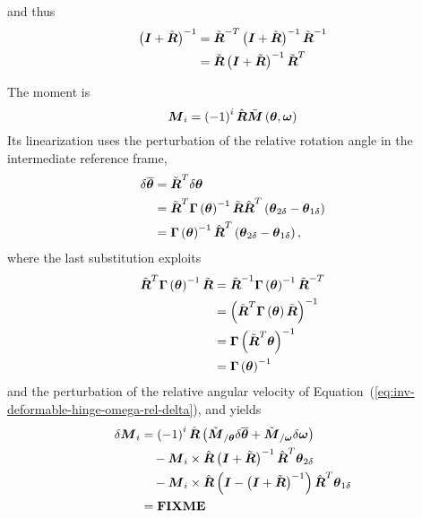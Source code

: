 \documentclass[10pt,dvips,fleqn]{report}
\newcommand{\T}[1]{\boldsymbol{#1}}
\begin{document}
and thus
\begin{align}
	\plbr{\T{I} + \tilde{\T{R}}}^{-1}
	&= \tilde{\T{R}}^{-T} \plbr{\T{I} + \tilde{\T{R}}}^{-1} \tilde{\T{R}}^{-1} \\
	&= \tilde{\T{R}} \plbr{\T{I} + \tilde{\T{R}}}^{-1} \tilde{\T{R}}^T
\end{align}
\begin{comment}
\begin{equation}
	\T{\omega} = \hat{\T{R}}^T \plbr{
		\T{I} + \frac{1}{2} \plbr{\T{R}_{1h} \T{\theta}} \times{}
	} \plbr{\T{\omega}_2 - \T{\omega}_1}
\end{equation}
The linearization of the angular velocity yields
\begin{align}
	\delta\T{\omega}
	&= \textbf{FIXME}
\end{align}
\end{comment}
The moment is
\begin{equation}
	\T{M}_i = \plbr{-1}^i \hat{\T{R}} \tilde{\T{M}}\plbr{\T{\theta}, \T{\omega}}
\end{equation}
Its linearization uses the perturbation of the relative rotation angle
in the intermediate reference frame,
\begin{align}
	\delta\overline{\T{\theta}}
	&= \tilde{\T{R}}^T \delta\T{\theta} \\
	&= \tilde{\T{R}}^T \T{\Gamma}\plbr{\T{\theta}}^{-1} \tilde{\T{R}} \hat{\T{R}}^T \plbr{\T{\theta}_{2\delta} - \T{\theta}_{1\delta}} \\
	&= \T{\Gamma}\plbr{\T{\theta}}^{-1} \hat{\T{R}}^T \plbr{\T{\theta}_{2\delta} - \T{\theta}_{1\delta}} ,
\end{align}
where the last substitution exploits
\begin{align}
	\tilde{\T{R}}^T \T{\Gamma}\plbr{\T{\theta}}^{-1} \tilde{\T{R}}
	&= \tilde{\T{R}}^{-1} \T{\Gamma}\plbr{\T{\theta}}^{-1} \tilde{\T{R}}^{-T} \\
	&= \plbr{
		\tilde{\T{R}}^T \T{\Gamma}\plbr{\T{\theta}} \tilde{\T{R}}
	}^{-1} \\
	&= \T{\Gamma}\plbr{\tilde{\T{R}}^T \T{\theta}}^{-1} \\
	&= \T{\Gamma}\plbr{\T{\theta}}^{-1}
\end{align}
and the perturbation of the relative angular velocity
of Equation~(\ref{eq:inv-deformable-hinge-omega-rel-delta}),
and yields
\begin{align}
	\delta\T{M}_i
	&= \plbr{-1}^i \hat{\T{R}} \plbr{
		\tilde{\T{M}}_{/\T{\theta}} \delta\overline{\T{\theta}}
		+ \tilde{\T{M}}_{/\T{\omega}} \delta\T{\omega}
	} \nonumber \\
	& \mbox{\hspace{10pt}} - \T{M}_i \times \hat{\T{R}}
		\plbr{\T{I} + \tilde{\T{R}}}^{-1} \hat{\T{R}}^T \T{\theta}_{2\delta}
	\nonumber \\
	& \mbox{\hspace{10pt}} - \T{M}_i \times \hat{\T{R}} 
		\plbr{\T{I} - \plbr{\T{I} + \tilde{\T{R}}}^{-1}} \hat{\T{R}}^T \T{\theta}_{1\delta}
	\\
	&= \textbf{FIXME}
\end{align}
\end{document}
